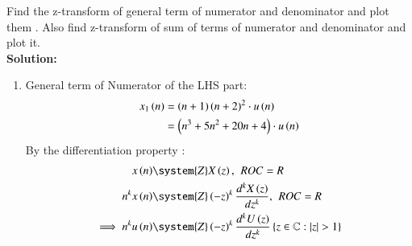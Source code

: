 \documentclass[journal,12pt,twocolumn]{IEEEtran}
\theoremstyle{remark}
\begin{document}
Find the z-transform of general term of numerator and denominator and plot them . Also find z-transform of sum of terms of numerator and denominator and plot it.\\ 
\textbf{Solution:}

\begin{enumerate}[label=\arabic*.]
\item General term of Numerator of the LHS part:
\begin{align}
    x_1\left(n\right) &= \left(n+1\right)\left(n+2\right)^{2}\cdot u\left(n\right) \\
                &= \left(n^{3} + 5n^{2} + 20n + 4\right) \cdot u\left(n\right)\label{eq:11.9.5.26.1} 
\end{align}
By the differentiation property :
\begin{align}
x\brak{n} &\system{Z} X\brak{z},\hspace{4pt} ROC = R\\
n^k x\brak{n} &\system{Z} \brak{-z}^k \frac{d^kX\brak{z}}{dz^k},\hspace{4pt} ROC = R \\
\implies n^k u\brak{n} & \system{Z} \brak{-z}^k \frac{d^kU\brak{z}}{dz^k} \cbrak{z\in\mathbb{C} : \lvert z \rvert > 1}
\end{align}


\end{enumerate}
\end{document}
